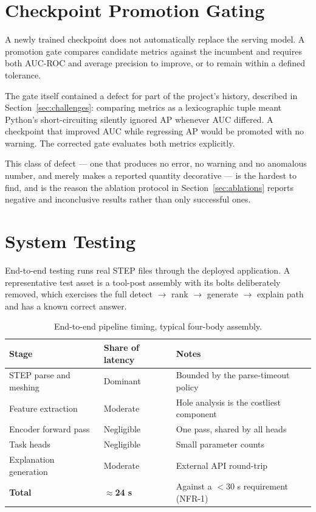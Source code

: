 \documentclass[12pt,oneside,a4paper]{report}
\begin{document}
\section{Checkpoint Promotion Gating}

A newly trained checkpoint does not automatically replace the serving model. A
promotion gate compares candidate metrics against the incumbent and requires
both AUC-ROC and average precision to improve, or to remain within a defined
tolerance.

The gate itself contained a defect for part of the project's history, described
in Section~\ref{sec:challenges}: comparing metrics as a lexicographic tuple
meant Python's short-circuiting silently ignored AP whenever AUC differed. A
checkpoint that improved AUC while regressing AP would be promoted with no
warning. The corrected gate evaluates both metrics explicitly.

This class of defect --- one that produces no error, no warning and no
anomalous number, and merely makes a reported quantity decorative --- is the
hardest to find, and is the reason the ablation protocol in
Section~\ref{sec:ablations} reports negative and inconclusive results rather
than only successful ones.

\section{System Testing}

End-to-end testing runs real STEP files through the deployed application. A
representative test asset is a tool-post assembly with its bolts deliberately
removed, which exercises the full detect $\to$ rank $\to$ generate $\to$
explain path and has a known correct answer.

\begin{table}[h]
\centering
\caption{End-to-end pipeline timing, typical four-body assembly.}
\label{tab:timing}
\small
\begin{tabularx}{\textwidth}{@{}L{4.6cm}C{3.0cm}X@{}}
\toprule
\textbf{Stage} & \textbf{Share of latency} & \textbf{Notes} \\
\midrule
STEP parse and meshing & Dominant & Bounded by the parse-timeout policy \\
Feature extraction & Moderate & Hole analysis is the costliest component \\
Encoder forward pass & Negligible & One pass, shared by all heads \\
Task heads & Negligible & Small parameter counts \\
Explanation generation & Moderate & External API round-trip \\
\midrule
\textbf{Total} & \textbf{$\approx$24 s} & Against a $<$30 s requirement (NFR-1) \\
\bottomrule
\end{tabularx}
\end{table}
\end{document}

